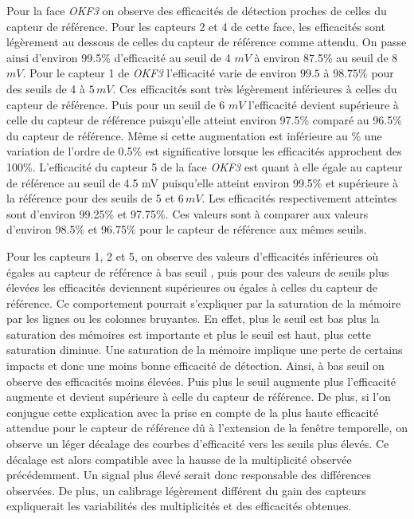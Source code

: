    Pour la face \textit{OKF3} on observe des efficacit\'es de d\'etection proches de celles du capteur de r\'ef\'erence. Pour les capteurs 2 et 4 de cette face, les efficacit\'es sont l\'eg\`erement au dessous de celles du capteur de r\'ef\'erence comme attendu. On passe ainsi d'environ 99.5\% d'efficacité au seuil de 4 $mV$ \`a environ 87.5\% au seuil de 8 $mV$. Pour le capteur 1 de \textit{OKF3} l'efficacité varie de environ $99.5$ \`a $98.75\%$ pour des seuils de 4 \`a $5 \, mV$. Ces efficacit\'es sont tr\`es l\'eg\`erement inf\'erieures \`a celles du capteur de r\'ef\'erence. Puis pour un seuil de 6 $mV$ l'efficacit\'e devient supérieure \`a celle du capteur de r\'ef\'erence puisqu'elle atteint environ 97.5\% compar\'e au 96.5\% du capteur de r\'ef\'erence. Même si cette augmentation est inf\'erieure au \% une variation de l'ordre de 0.5\% est significative lorsque les efficacit\'es approchent des 100\%. L'efficacit\'e du capteur 5 de la face \textit{OKF3} est quant \`a elle \'egale au capteur de r\'ef\'erence au seuil de 4.5 mV puisqu'elle atteint environ 99.5\% et sup\'erieure \`a la r\'ef\'erence pour des seuils de 5 et $6 \, mV$. Les efficacit\'es respectivement atteintes sont d'environ 99.25\% et 97.75\%. Ces valeurs sont \`a comparer aux valeurs d'environ 98.5\% et 96.75\% pour le capteur de r\'ef\'erence aux m\^emes seuils. 
   
   \medskip
   
   Pour les capteurs 1, 2 et 5, on observe des valeurs d'efficacit\'es inf\'erieures o\`u \'egales au capteur de r\'ef\'erence \`a bas seuil , puis pour des valeurs de seuils plus \'elev\'ees les efficacit\'es deviennent sup\'erieures ou \'egales \`a celles du capteur de r\'ef\'erence. Ce comportement pourrait s'expliquer par la saturation de la m\'emoire par les lignes ou les colonnes bruyantes. En effet, plus le seuil est bas plus la saturation des m\'emoires est importante et plus le seuil est haut, plus cette saturation diminue. Une saturation de la m\'emoire implique une perte de certains impacts et donc une moins bonne efficacit\'e de d\'etection. Ainsi, \`a bas seuil on observe des efficacit\'es moins \'elev\'ees. Puis plus le seuil augmente plus l'efficacit\'e augmente et devient sup\'erieure \`a celle du capteur de r\'ef\'erence. De plus, si l'on conjugue cette explication avec la prise en compte de la plus haute efficacit\'e attendue pour le capteur de r\'ef\'erence d\^u \`a l'extension de la fen\^etre temporelle, on observe un l\'eger d\'ecalage des courbes d'efficacit\'e vers les seuils plus \'elev\'es. Ce d\'ecalage est alors compatible avec la hausse de la multiplicit\'e observ\'ee pr\'ec\'edemment. Un signal plus \'elev\'e serait donc responsable des diff\'erences observ\'ees. De plus, un calibrage l\'eg\`erement diff\'erent du gain des capteurs expliquerait les variabilit\'es des multiplicit\'es et des efficacit\'es obtenues. 
   

